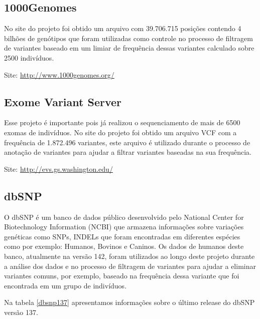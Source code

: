 \subsection{1000Genomes}

No site do projeto foi obtido um arquivo com 39.706.715 posições contendo 4 bilhões de genótipos que foram utilizadas como controle no processo de filtragem de variantes baseado em um limiar de frequência dessas variantes calculado sobre 2500 indivíduos.

Site: \url{http://www.1000genomes.org/}

\subsection{Exome Variant Server}

Esse projeto é importante pois já realizou o sequenciamento de mais de 6500 exomas de indivíduos. No site do projeto foi obtido um arquivo VCF com a frequência de 1.872.496 variantes, este arquivo é utilizado durante o processo de anotação de variantes para ajudar a filtrar variantes baseadas na sua frequência.

Site: \url{http://evs.gs.washington.edu/}

\subsection{dbSNP}

O dbSNP é um banco de dados público desenvolvido pelo National Center for Biotechnology Information (NCBI) que armazena informações sobre variações genéticas como SNPs, INDELs que foram encontradas em diferentes espécies como por exemplo: Humanos, Bovinos e Caninos. Os dados de humanos deste banco, atualmente na versão 142, foram utilizados ao longo deste projeto durante a análise dos dados e no processo de filtragem de variantes para ajudar a eliminar variantes comuns, por exemplo,  baseado na frequência dessa variante que foi encontrada em um grupo de indivíduos.

Na tabela \ref{dbsnp137} apresentamos informações sobre o último release do dbSNP versão 137.

